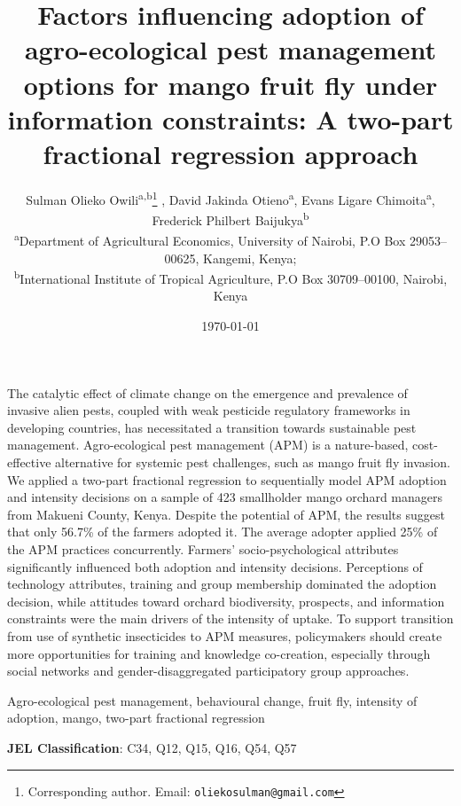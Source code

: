 \documentclass[fleqn,twoside,reqno]{article}
\title{\fontsize{14}{14}\selectfont \textbf{Factors influencing adoption of agro-ecological pest management options for mango fruit fly under information constraints: A two-part fractional regression approach}}
\author{
\begin{tabular}{p{\dimexpr\textwidth-2\tabcolsep}}
Sulman Olieko Owili\textsuperscript{a,b}\thanks{Corresponding author. Email: \texttt{oliekosulman@gmail.com}} \href{https://orcid.org/0000-0001-7401-5326}\orcid{}, 
David Jakinda Otieno\textsuperscript{a}\href{https://orcid.org/0000-0001-9904-0819}\orcid{}, 
Evans Ligare Chimoita\textsuperscript{a}, 
Frederick Philbert Baijukya\textsuperscript{b} \\
\medskip
\textsuperscript{a}Department of Agricultural Economics, University of Nairobi, P.O Box 29053--00625, Kangemi, Kenya; \\
\textsuperscript{b}International Institute of Tropical Agriculture, P.O Box 30709--00100, Nairobi, Kenya
\end{tabular}
}
\date{\today}
\renewenvironment{abstract}
 {\begin{center}\large\MakeUppercase{\abstractname}\end{center}
  \list{}{\leftmargin=1.5em\rightmargin=1.5em \parsep=0pt \relax}
  \item\relax}
 {\endlist}
\newenvironment{Keywords}{%
\sbox0{\textbf{Keywords}: }%
\list{}{\labelwidth\wd0 \leftmargin\wd0 \labelsep 0pt }
             \item[\usebox0]}
               {\endlist}
\begin{document}
\maketitle
\begin{abstract}
The catalytic effect of climate change on the emergence and prevalence of invasive alien pests, coupled with weak pesticide regulatory frameworks in developing countries, has necessitated a transition towards sustainable pest management. Agro-ecological pest management (APM) is a nature-based, cost-effective alternative for systemic pest challenges, such as mango fruit fly invasion. We applied a two-part fractional regression to sequentially model APM adoption and intensity decisions on a sample of 423 smallholder mango orchard managers from Makueni County, Kenya. Despite the potential of APM, the results suggest that only 56.7\% of the farmers adopted it. The average adopter applied 25\% of the APM practices concurrently. Farmers’ socio-psychological attributes significantly influenced both adoption and intensity decisions. Perceptions of technology attributes, training and group membership dominated the adoption decision, while attitudes toward orchard biodiversity, prospects, and information constraints were the main drivers of the intensity of uptake. To support transition from use of synthetic insecticides to APM measures, policymakers should create more opportunities for training and knowledge co-creation, especially through social networks and gender-disaggregated participatory group approaches.\\
\end{abstract}

\begin{Keywords} Agro-ecological pest management, behavioural change, fruit fly, intensity of adoption, mango, two-part fractional regression
\end{Keywords}

\textbf{JEL Classification}: C34, Q12, Q15, Q16, Q54, Q57

\doublespacing  %
\end{document}
